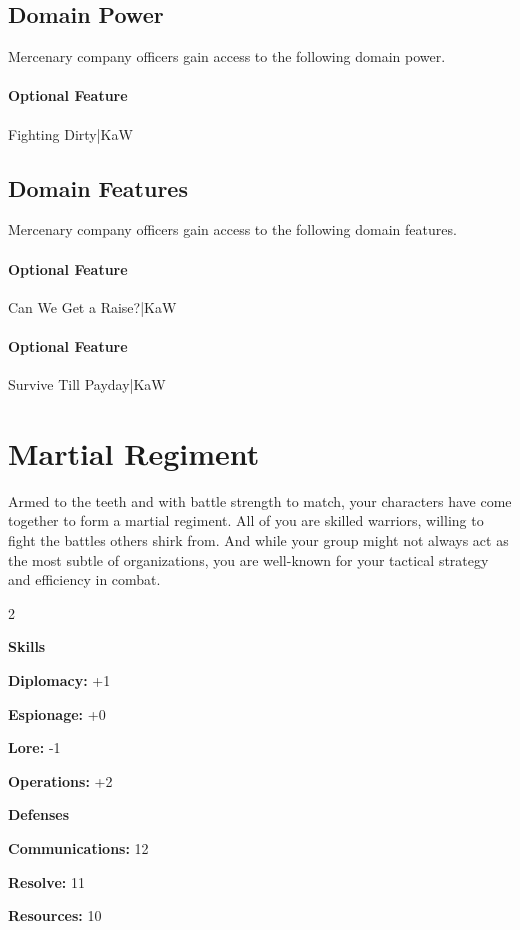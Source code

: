 \documentclass[10pt,a4paper,twoside,bg=print,twocolumn,openany,nodeprecatedcode]{dndbook}
\begin{document}
\subsection{Domain Power}
Mercenary company officers gain access to the following domain power.

\paragraph{Optional Feature}
Fighting Dirty|KaW

\subsection{Domain Features}
Mercenary company officers gain access to the following domain features.

\paragraph{Optional Feature}
Can We Get a Raise?|KaW

\paragraph{Optional Feature}
Survive Till Payday|KaW

\section{Martial Regiment}
Armed to the teeth and with battle strength to match, your characters have come together to form a martial regiment. All of you are skilled warriors, willing to fight the battles others shirk from. And while your group might not always act as the most subtle of organizations, you are well-known for your tactical strategy and efficiency in combat.


\begin{itemize}
\begin{multicols}{2}
\item \textbf{Skills}
\item \textbf{Diplomacy:} +1
\item \textbf{Espionage:} +0
\item \textbf{Lore:} -1
\item \textbf{Operations:} +2
\item \textbf{Defenses}
\item \textbf{Communications:} 12
\item \textbf{Resolve:} 11
\item \textbf{Resources:} 10
\end{multicols}

\end{itemize}
\end{document}
